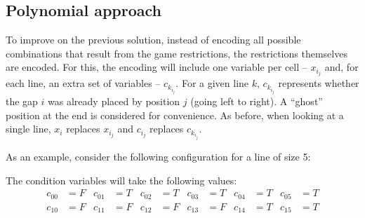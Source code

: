 \documentclass[12pt]{article}
\begin{document}
\subsection*{Polynomial approach}

To improve on the previous solution, instead of encoding all possible combinations that result from the game restrictions, the restrictions themselves are encoded.
For this, the encoding will include one variable per cell -- $x_i_j$ and, for each line, an extra set of variables -- $c_k_i_j$.
For a given line $k$, $c_k_i_j$ represents whether the gap $i$ was already placed by position $j$ (going left to right).
A ``ghost'' position at the end is considered for convenience.
As before, when looking at a single line, $x_i$ replaces $x_i_j$ and $c_i_j$ replaces $c_k_i_j$.

As an example, consider the following configuration for a line of size 5:

\begin{center}
\end{center}

The condition variables will take the following values:
\begin{align*}
c_{00} &= F & c_{01} &= T & c_{02} &= T & c_{03} &= T & c_{04} &= T & c_{05} &= T \\
c_{10} &= F & c_{11} &= F & c_{12} &= F & c_{13} &= F & c_{14} &= T & c_{15} &= T
\end{align*}
\end{document}
